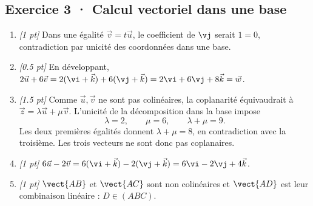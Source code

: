 \subsection*{Exercice 3 · Calcul vectoriel dans une base}\begin{enumerate}

\item \textit{[1 pt]} Dans une égalité $\vec v=t\vec u$, le coefficient de $\vj $ serait $1=0$, contradiction par unicité des coordonnées dans une base.

\item \textit{[\num{0,5} pt]} En développant, $2\vec u+6\vec v=2(\vi +\vec k)+6(\vj +\vec k)=2\vi +6\vj +8\vec k=\vec w$.

\item \textit{[\num{1,5} pt]} Comme $\vec u,\vec v$ ne sont pas colinéaires, la coplanarité équivaudrait à $\vec z=\lambda\vec u+\mu\vec v$. L'unicité de la décomposition dans la base impose
\[\lambda=2,\qquad\mu=6,\qquad\lambda+\mu=9.\]
Les deux premières égalités donnent $\lambda+\mu=8$, en contradiction avec la troisième. Les trois vecteurs ne sont donc pas coplanaires.

\item \textit{[1 pt]} $6\vec u-2\vec v=6(\vi +\vec k)-2(\vj +\vec k)=6\vi -2\vj +4\vec k$.

\item \textit{[1 pt]} $\vect{AB}$ et $\vect{AC}$ sont non colinéaires et $\vect{AD}$ est leur combinaison linéaire : $D\in(ABC)$.

\end{enumerate}


